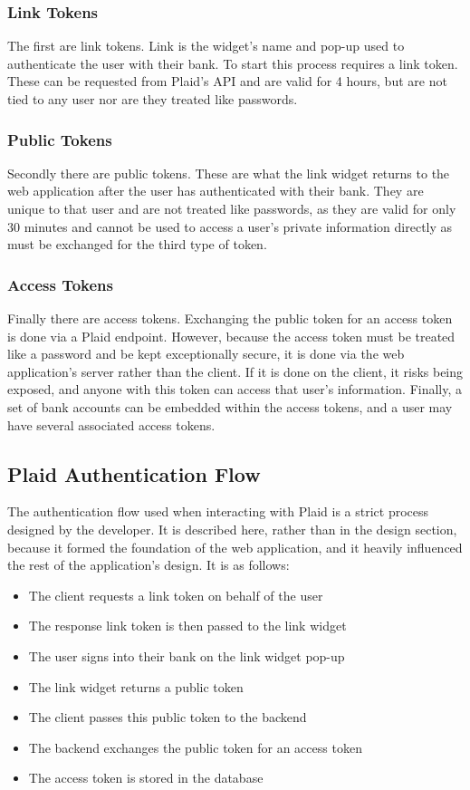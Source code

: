\subsubsection{Link Tokens}
The first are link tokens. Link is the widget's name and pop-up used to authenticate the user with their bank. To start this process requires a link token. These can be requested from Plaid's API and are valid for 4 hours, but are not tied to any user nor are they treated like passwords.

\subsubsection{Public Tokens}
Secondly there are public tokens. These are what the link widget returns to the web application after the user has authenticated with their bank. They are unique to that user and are not treated like passwords, as they are valid for only 30 minutes and cannot be used to access a user's private information directly as must be exchanged for the third type of token.
\subsubsection{Access Tokens}
Finally there are access tokens. Exchanging the public token for an access token is done via a Plaid endpoint. However, because the access token must be treated like a password and be kept exceptionally secure, it is done via the web application's server rather than the client. If it is done on the client, it risks being exposed, and anyone with this token can access that user's information. Finally, a set of bank accounts can be embedded within the access tokens, and a user may have several associated access tokens.

\subsection{Plaid Authentication Flow}
\label{sec:plaid-authentication-flow}
The authentication flow used when interacting with Plaid is a strict process designed by the developer. It is described here, rather than in the design section, because it formed the foundation of the web application, and it heavily influenced the rest of the application's design. It is as follows:

\begin{itemize}
    \item The client requests a link token on behalf of the user
    \item The response link token is then passed to the link widget
    \item The user signs into their bank on the link widget pop-up
    \item The link widget returns a public token
    \item The client passes this public token to the backend
    \item The backend exchanges the public token for an access token
    \item The access token is stored in the database
\end{itemize}

